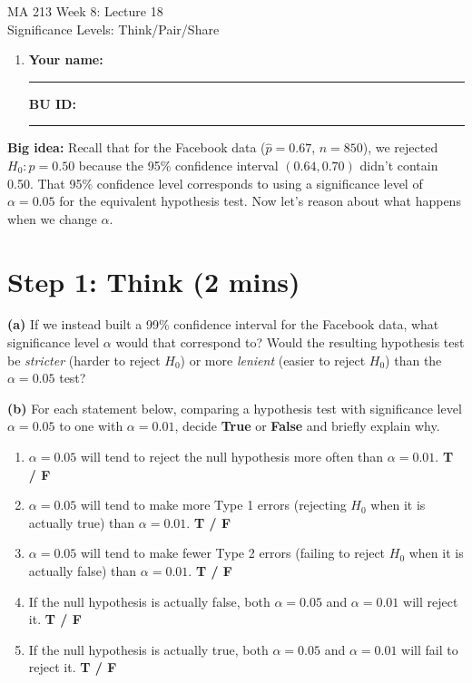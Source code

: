 \documentclass{article}
\newcommand{\coursenumber}{MA 213}
\newcommand{\weekplaceholder}{8}
\newcommand{\lectureplaceholder}{18}
\newcommand{\lecturetitle}{Significance Levels: Think/Pair/Share}
\newcommand{\nameblank}{\rule{1.75in}{0.4pt}}
\newcommand{\idblank}{\rule{1.55in}{0.4pt}}
\begin{document}
\begin{center}
  {\LARGE \coursenumber{} Week \weekplaceholder{}: Lecture \lectureplaceholder{}}\\
  {\large \lecturetitle{}}
\end{center}

\begin{enumerate}[label=\arabic*.,leftmargin=*,itemsep=.7em]
  \item \textbf{Your name:} \nameblank \hfill \textbf{BU ID:} \idblank
\end{enumerate}

\textbf{Big idea:} Recall that for the Facebook data ($\hat p = 0.67$, $n=850$), we rejected $H_0: p=0.50$ because the 95\% confidence interval $(0.64, 0.70)$ didn't contain 0.50. That 95\% confidence level corresponds to using a significance level of $\alpha = 0.05$ for the equivalent hypothesis test. Now let's reason about what happens when we change $\alpha$.

\section*{Step 1: Think (2 mins)}

\textbf{(a)} If we instead built a 99\% confidence interval for the Facebook data, what significance level $\alpha$ would that correspond to? Would the resulting hypothesis test be \emph{stricter} (harder to reject $H_0$) or more \emph{lenient} (easier to reject $H_0$) than the $\alpha=0.05$ test?
\vspace{0.6in}

\textbf{(b)} For each statement below, comparing a hypothesis test with significance level $\alpha = 0.05$ to one with $\alpha = 0.01$, decide \textbf{True} or \textbf{False} and briefly explain why.

\begin{enumerate}[label=(\roman*)]
  \item $\alpha = 0.05$ will tend to reject the null hypothesis more often than $\alpha = 0.01$. \hfill \textbf{T / F}
  \vspace{0.3in}

  \item $\alpha = 0.05$ will tend to make more Type 1 errors (rejecting $H_0$ when it is actually true) than $\alpha = 0.01$. \hfill \textbf{T / F}
  \vspace{0.3in}

  \item $\alpha = 0.05$ will tend to make fewer Type 2 errors (failing to reject $H_0$ when it is actually false) than $\alpha = 0.01$. \hfill \textbf{T / F}
  \vspace{0.3in}

  \item If the null hypothesis is actually false, both $\alpha = 0.05$ and $\alpha = 0.01$ will reject it. \hfill \textbf{T / F}
  \vspace{0.3in}

  \item If the null hypothesis is actually true, both $\alpha = 0.05$ and $\alpha = 0.01$ will fail to reject it. \hfill \textbf{T / F}
  \vspace{0.3in}
\end{enumerate}
\end{document}
